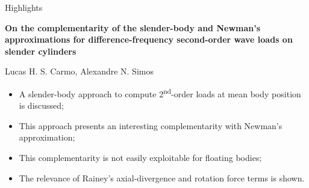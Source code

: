 \documentclass[a4paper,fleqn]{cas-sc}
\begin{document}
{\noindent \fontsize{14pt}{16pt}\selectfont Highlights\par}
\vskip12pt
{\noindent \fontsize{12pt}{14pt}\bfseries\selectfont On the complementarity of the slender-body and Newman's approximations for difference-frequency second-order wave loads on slender cylinders \par}
\vskip6pt
{\noindent Lucas H. S. Carmo, Alexandre N. Simos\par}
\vskip12pt
\noindent \ignorespaces
\begin{itemize}
	\item A slender-body approach to compute 2\textsuperscript{nd}-order loads at mean body position is discussed;
	
	\item This approach presents an interesting complementarity with Newman's approximation;
	
	\item This complementarity is not easily exploitable for floating bodies;
	
	\item The relevance of Rainey's axial-divergence and rotation force terms is shown.
\end{itemize}
\end{document}
